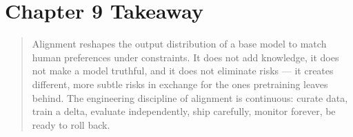 \section{Chapter 9 Takeaway}

\begin{quote}
Alignment reshapes the output distribution of a base model to match
human preferences under constraints. It does not add knowledge, it
does not make a model truthful, and it does not eliminate risks ---
it creates different, more subtle risks in exchange for the ones
pretraining leaves behind. The engineering discipline of alignment
is continuous: curate data, train a delta, evaluate independently,
ship carefully, monitor forever, be ready to roll back.
\end{quote}
